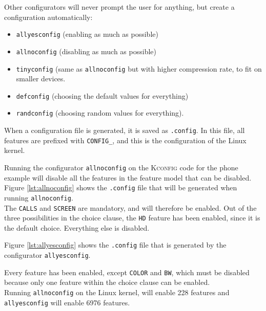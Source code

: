 \documentclass[a4paper,11pt]{report}
\newcommand{\figa}{
    \begin{figure}[!htpb]
    \centering
}
\newcommand{\figb}[2]{
    \caption{#1}
    \label{#2}
    \end{figure}
}
\begin{document}
Other configurators will 
never prompt the user for anything, but create a configuration automatically: 
\begin{itemize}
    \item \texttt{allyesconfig} (enabling as much as possible) 
    \item \texttt{allnoconfig} (disabling as much as possible)
    \item \texttt{tinyconfig} (same as \texttt{allnoconfig} but with higher 
    compression rate, to fit on smaller devices.
    \item \texttt{defconfig} (choosing the default values for everything)
    \item \texttt{randconfig} (choosing random values for everything).
\end{itemize}


When a configuration file is generated, it is saved as \texttt{.config}.
In this file, all features are prefixed with \texttt{CONFIG\_}, and this is
the configuration of the Linux kernel. 

Running the configurator \texttt{allnoconfig} on the \textsc{Kconfig} code for 
the phone example will disable all the features 
in the feature model that can be disabled. Figure \ref{lst:allnoconfig} shows 
the \texttt{.config} file that will be generated when running 
\texttt{allnoconfig}.
\\

The \texttt{CALLS} and \texttt{SCREEN} are mandatory, and will 
therefore be enabled. Out of the three possibilities in the choice clause, the 
\texttt{HD} feature has been enabled, since it is the default choice. Everything
else is disabled.


\figa
    \subfigure[allnoconfig]{
        \label{lst:allnoconfig}
        
    }
    \qquad %
    \subfigure[allyesconfig]{
        \label{lst:allyesconfig}
        
    }
\figb{}{}


Figure \ref{lst:allyesconfig} shows the \texttt{.config} file that is generated by 
the configurator \texttt{allyesconfig}.

Every feature has been enabled, except \texttt{COLOR} and \texttt{BW}, which 
must be disabled because only one feature within the choice clause can be enabled.
\\

Running \texttt{allnoconfig} on the Linux kernel, will enable 228 features and 
\texttt{allyesconfig} will enable 6976 features.
\end{document}
